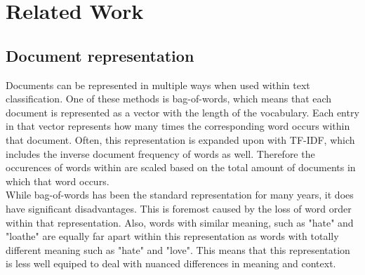 \section{Related Work}
\label{sec:rel}

\subsection{Document representation}
Documents can be represented in multiple ways when used within text classification. One of these methods is bag-of-words, which means that each document is represented as a vector with the length of the vocabulary. Each entry in that vector represents how many times the corresponding word occurs within that document. Often, this representation is expanded upon with TF-IDF, which includes the inverse document frequency of words as well. Therefore the occurences of words within are scaled based on the total amount of documents in which that word occurs.\\
While bag-of-words has been the standard representation for many years, it does have significant disadvantages. This is foremost caused by the loss of word order within that representation. Also, words with similar meaning, such as "hate" and "loathe" are equally far apart within this representation as words with totally different meaning such as "hate" and "love". This means that this representation is less well equiped to deal with nuanced differences in meaning and context.\\

%
%
%
%
%
